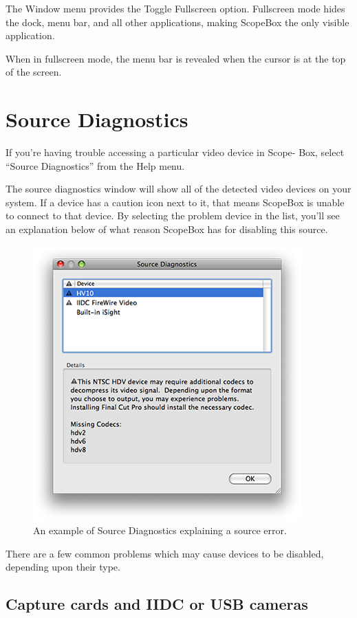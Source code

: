 \documentclass[10,letterpaper,]{report}
\begin{document}
The Window menu provides the Toggle Fullscreen option. Fullscreen mode
hides the dock, menu bar, and all other applications, making ScopeBox
the only visible application.

When in fullscreen mode, the menu bar is revealed when the cursor is at
the top of the screen.

\chapter{Source Diagnostics}

If you're having trouble accessing a particular video device in Scope-
Box, select ``Source Diagnostics'' from the Help menu.

The source diagnostics window will show all of the detected video
devices on your system. If a device has a caution icon next to it, that
means ScopeBox is unable to connect to that device. By selecting the
problem device in the list, you'll see an explanation below of what
reason ScopeBox has for disabling this source.

\begin{figure}[htbp]
\centering
\includegraphics{images/SourceDiagnostics.png}
\caption{An example of Source Diagnostics explaining a source error.}
\end{figure}

There are a few common problems which may cause devices to be disabled,
depending upon their type.

\section{Capture cards and IIDC or USB cameras}
\end{document}
